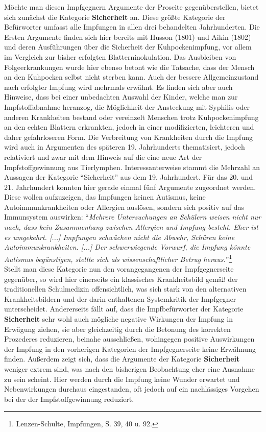 \documentclass[
    a4paper,
    12pt,
    hyphens,
    chapterprefix=true,
    headheight=33pt,
    footheight=29pt,
    headings=optiontohead, %
]{scrartcl}
\begin{document}
{Möchte man diesen Impfgegnern Argumente der Proseite gegenüberstellen, bietet sich zunächst die Kategorie \textbf{Sicherheit} an. Diese größte Kategorie der Befürworter umfasst alle Impfungen in allen drei behandelten Jahrhunderten. Die Ersten Argumente finden sich hier bereits mit Husson (1801) und Aikin (1802) und deren Ausführungen über die Sicherheit der Kuhpockenimpfung, vor allem im Vergleich zur bisher erfolgten Blatterninokulation. Das Ausbleiben von Folgeerkrankungen wurde hier ebenso betont wie die Tatsache, dass der Mensch an den Kuhpocken selbst nicht sterben kann. Auch der bessere Allgemeinzustand nach erfolgter Impfung wird mehrmals erwähnt. Es finden sich aber auch Hinweise, dass bei einer unbedachten Auswahl der Kinder, welche man zur Impfstoffabnahme heranzog, die Möglichkeit der Ansteckung mit Syphilis oder anderen Krankheiten bestand oder vereinzelt Menschen trotz Kuhpockenimpfung an den echten Blattern erkrankten, jedoch in einer modifizierten, leichteren und daher gefahrloseren Form. Die Verbreitung von Krankheiten durch die Impfung wird auch in Argumenten des späteren 19. Jahrhunderts thematisiert, jedoch relativiert und zwar mit dem Hinweis auf die eine neue Art der Impfstoffgewinnung aus Tierlymphen. Interessanterweise stammt die Mehrzahl an Aussagen der Kategorie "`Sicherheit"' aus dem 19. Jahrhundert. Für das 20. und 21. Jahrhundert konnten hier gerade einmal fünf Argumente zugeordnet werden. Diese wollen aufzuzeigen, das Impfungen keinen Autismus, keine Autoimmunkrankheiten oder Allergien auslösen, sondern sich positiv auf das Immunsystem auswirken: "`\textit{Mehrere Untersuchungen an Schülern weisen nicht nur nach, dass kein Zusammenhang zwischen Allergien und Impfung besteht. Eher ist es umgekehrt. [...] Impfungen schwächen nicht die Abwehr, Schüren keine Autoimmunkrankheiten. [...] Der schwerwiegende Vorwurf, die Impfung könnte Autismus begünstigen, stellte sich als wissenschaftlicher Betrug heraus.}"'\footnote{Lenzen-Schulte, Impfungen, S. 39, 40 u. 92.}
\\
Stellt man diese Kategorie nun den vorangegangenen der Impfgegnerseite gegenüber, so wird hier einerseits ein klassisches Krankheitsbild gemäß der traditionellen Schulmedizin offensichtlich, was sich stark von den alternativen Krankheitsbildern und der darin enthaltenen Systemkritik der Impfgegner unterscheidet. Andererseits fällt auf, dass die Impfbefürworter der Kategorie \textbf{Sicherheit} sehr wohl auch mögliche negative Wirkungen der Impfung in Erwägung ziehen, sie aber gleichzeitig durch die Betonung des korrekten Prozederes reduzieren, beinahe ausschließen, wohingegen positive Auswirkungen der Impfung in den vorherigen Kategorien der Impfgegnerseite keine Erwähnung finden. Außerdem zeigt sich, dass die Argumente der Kategorie \textbf{Sicherheit} weniger extrem sind, was nach den bisherigen Beobachtung eher eine Ausnahme zu sein scheint. Hier werden durch die Impfung keine Wunder erwartet und Nebenwirkungen durchaus eingestanden, oft jedoch auf ein nachlässiges Vorgehen bei der der Impfstoffgewinnung reduziert.\\
}
\end{document}
